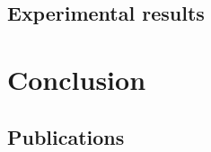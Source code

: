 \documentclass[11pt, oneside]{Thesis} %
\begin{document}
\section{Experimental results}
\chapter{Conclusion}
\section{Publications}
% 
%
% 
% 
% 
% 



\appendix %



%
%


\backmatter


\label{Bibliography}



\end{document}
